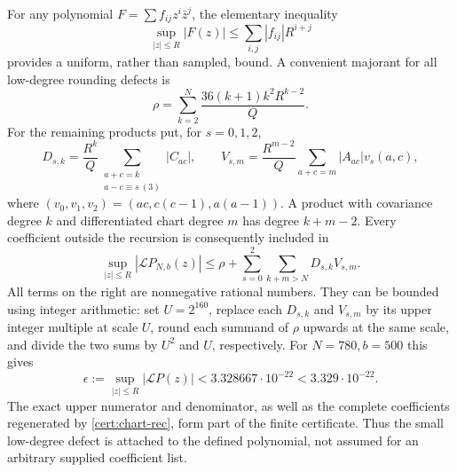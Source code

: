 For any polynomial $F=\sum f_{ij}z^i\bar z^j$, the elementary inequality
\begin{equation}\label{cert:absolute-majorant}
 \sup_{|z|\leq R}|F(z)|\leq\sum_{i,j}|f_{ij}|R^{i+j}
\end{equation}
provides a uniform, rather than sampled, bound.  A convenient majorant for
all low-degree rounding defects is
\[
 \rho=\sum_{k=2}^N\frac{36(k+1)k^2R^{k-2}}Q.
\]
For the remaining products put, for $s=0,1,2$,
\[
 D_{s,k}=\frac{R^k}{Q}\sum_{\substack{a+c=k\\a-c\equiv s\ (3)}}|C_{ac}|,
 \qquad
 V_{s,m}=\frac{R^{m-2}}Q\sum_{a+c=m}|A_{ac}|v_s(a,c),
\]
where $(v_0,v_1,v_2)=(ac,c(c-1),a(a-1))$.  A product with covariance
degree $k$ and differentiated chart degree $m$ has degree $k+m-2$.
Every coefficient outside the recursion is consequently included in
\begin{equation}\label{cert:residual-sum}
 \sup_{|z|\leq R}|\mathcal L P_{N,b}(z)|
 \leq\rho+\sum_{s=0}^2\sum_{k+m>N}D_{s,k}V_{s,m}.
\end{equation}
All terms on the right are nonnegative rational numbers.  They can be
bounded using integer arithmetic: set $U=2^{160}$, replace each $D_{s,k}$
and $V_{s,m}$ by its upper integer multiple at scale $U$, round each
summand of $\rho$ upwards at the same scale, and divide the two sums by
$U^2$ and $U$, respectively.  For $N=780,b=500$ this gives
\begin{equation}\label{cert:epsilon}
 \epsilon:=\sup_{|z|\leq R}|\mathcal L P(z)|
      <3.328667\cdot10^{-22}<3.329\cdot10^{-22}.
\end{equation}
The exact upper numerator and denominator, as well as the complete
coefficients regenerated by \eqref{cert:chart-rec}, form part of the finite
certificate.  Thus the small low-degree defect is attached to the defined
polynomial, not assumed for an arbitrary supplied coefficient list.

